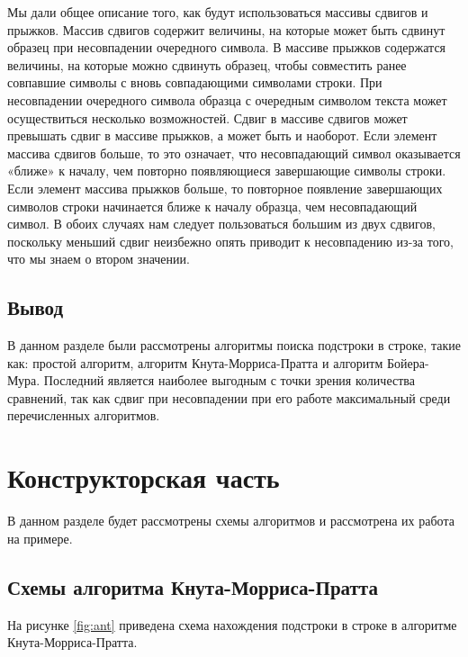 \documentclass[a4paper, 14pt]{article}
\begin{document}
	Мы дали общее описание того, как будут использоваться массивы сдвигов и прыжков. Массив сдвигов содержит величины, на которые может быть сдвинут образец при несовпадении очередного символа. В массиве прыжков содержатся величины, на которые можно сдвинуть образец, чтобы совместить ранее совпавшие символы с вновь совпадающими символами строки. При несовпадении очередного символа образца с очередным символом текста может осуществиться несколько возможностей. Сдвиг в массиве сдвигов может превышать сдвиг в массиве прыжков, а может быть и наоборот. Если элемент массива сдвигов больше, то это означает, что несовпадающий символ оказывается «ближе» к началу, чем повторно появляющиеся завершающие символы строки. Если элемент массива прыжков больше, то повторное появление завершающих символов строки начинается ближе к началу образца, чем несовпадающий символ. В обоих случаях нам следует пользоваться большим из двух сдвигов, поскольку меньший сдвиг неизбежно опять приводит к несовпадению из-за того, что мы знаем о втором значении.
    \subsection{Вывод}
	В данном разделе были рассмотрены алгоритмы поиска подстроки в строке, такие как: простой алгоритм, алгоритм Кнута-Морриса-Пратта и алгоритм Бойера-Мура. Последний является наиболее выгодным с точки зрения количества сравнений, так как сдвиг при несовпадении при его работе максимальный среди перечисленных алгоритмов. 
		\newpage
        \section{Конструкторская часть}
        В данном разделе будет рассмотрены схемы алгоритмов и рассмотрена их работа на примере.
        \subsection{Схемы алгоритма Кнута-Морриса-Пратта}
        На рисунке \ref{fig:ant} приведена схема нахождения подстроки в строке в алгоритме Кнута-Морриса-Пратта.\\
\end{document}
